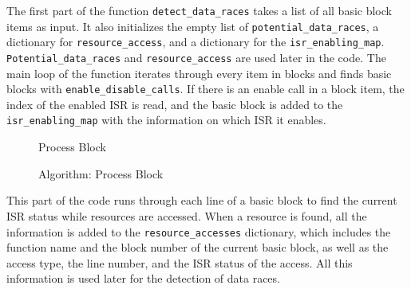 \documentclass[
fancyheadings, %
%
%
]{stsreprt}
\begin{document}
{The first part of the function \texttt{detect\_data\_races} takes a list of all basic block items as input. It also initializes the empty list of \texttt{potential\_data\_races}, a dictionary for \texttt{resource\_access}, and a dictionary for the \texttt{isr\_enabling\_map}. \texttt{Potential\_data\_races} and \texttt{resource\_access} are used later in the code. The main loop of the function iterates through every item in blocks and finds basic blocks with \texttt{enable\_disable\_calls}. If there is an enable call in a block item, the index of the enabled \ac{ISR} is read, and the basic block is added to the \texttt{isr\_enabling\_map} with the information on which \ac{ISR} it enables.

\begin{figure}[H]
\centering
\begin{algorithm}[H]
	\caption{Process Block}
	\DontPrintSemicolon
	\SetAlgoLined
	\BlankLine
\end{algorithm}
\caption{Algorithm: Process Block}
\end{figure}
\vspace{1cm}

This part of the code runs through each line of a basic block to find the current \ac{ISR} status while resources are accessed. When a resource is found, all the information is added to the \texttt{resource\_accesses} dictionary, which includes the function name and the block number of the current basic block, as well as the access type, the line number, and the \ac{ISR} status of the access. All this information is used later for the detection of data races.

}
\end{document}
